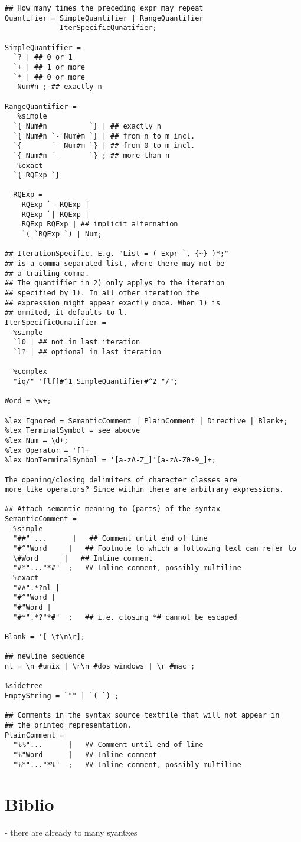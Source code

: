 \documentclass[a4paper]{report}
\begin{document}
\begin{verbatim}
## How many times the preceding expr may repeat
Quantifier = SimpleQuantifier | RangeQuantifier
             IterSpecificQunatifier;
           
SimpleQuantifier =           
  `? | ## 0 or 1
  `+ | ## 1 or more
  `* | ## 0 or more
   Num#n ; ## exactly n
  
RangeQuantifier =  
   %simple
  `{ Num#n          `} | ## exactly n
  `{ Num#n `- Num#m `} | ## from n to m incl.
  `{       `- Num#m `} | ## from 0 to m incl.
  `{ Num#n `-       `} ; ## more than n
   %exact
  `{ RQExp `} 
  
  RQExp =
    RQExp `- RQExp | 
    RQExp `| RQExp |
    RQExp RQExp | ## implicit alternation
    `( `RQExp `) | Num;
  
## IterationSpecific. E.g. "List = ( Expr `, {~} )*;"
## is a comma separated list, where there may not be
## a trailing comma.
## The quantifier in 2) only applys to the iteration 
## specified by 1). In all other iteration the
## expression might appear exactly once. When 1) is
## ommited, it defaults to l.
IterSpecificQunatifier =  
  %simple
  `l0 | ## not in last iteration
  `l? | ## optional in last iteration

  %complex
  "iq/" '[lf]#^1 SimpleQuantifier#^2 "/";
  
Word = \w+;  
  
%lex Ignored = SemanticComment | PlainComment | Directive | Blank+;
%lex TerminalSymbol = see abocve
%lex Num = \d+;
%lex Operator = '[]+
%lex NonTerminalSymbol = '[a-zA-Z_]'[a-zA-Z0-9_]+;
        
The opening/closing delimiters of character classes are
more like operators? Since within there are arbitrary expressions.
           
## Attach semantic meaning to (parts) of the syntax
SemanticComment = 
  %simple                
  "##" ...      |   ## Comment until end of line
  "#^"Word     |   ## Footnote to which a following text can refer to
  \#Word      |   ## Inline comment
  "#*"..."*#"  ;   ## Inline comment, possibly multiline
  %exact
  "##".*?nl |
  "#^"Word |
  "#"Word |
  "#*".*?"*#"  ;   ## i.e. closing *# cannot be escaped
  
Blank = '[ \t\n\r];
      
## newline sequence  
nl = \n #unix | \r\n #dos_windows | \r #mac ;

%sidetree
EmptyString = `"" | `( `) ;

## Comments in the syntax source textfile that will not appear in 
## the printed representation.
PlainComment =
  "%%"...      |   ## Comment until end of line
  "%"Word      |   ## Inline comment
  "%*"..."*%"  ;   ## Inline comment, possibly multiline 

\end{verbatim}


\chapter{Biblio}

- there are already to many syantxes
\end{document}
